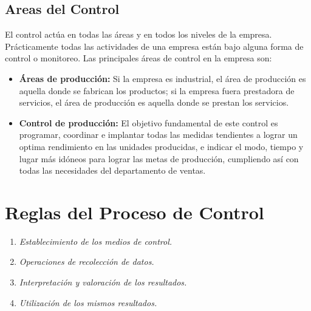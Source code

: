 \documentclass[12pt,letterpaper]{article}
\begin{document}
\subsection{Areas del Control}
El control actúa en todas las áreas y en todos los niveles de la empresa. Prácticamente todas las actividades de una empresa están bajo alguna forma de control o monitoreo. Las principales áreas de control en la empresa son:
\begin{itemize}
\item \textbf{Áreas de producción:} Si la empresa es industrial, el área de producción es aquella donde se fabrican los productos; si la empresa fuera prestadora de servicios, el área de producción es aquella donde se prestan los servicios.
\item \textbf{Control de producción:} El objetivo fundamental de este control es programar, coordinar e implantar todas las medidas tendientes a lograr un optima rendimiento en las unidades producidas, e indicar el modo, tiempo y lugar más idóneos para lograr las metas de producción, cumpliendo así con todas las necesidades del departamento de ventas. 
\end{itemize}
\section{Reglas del Proceso de Control}
\begin{enumerate}
\item	\textit{Establecimiento de los medios de control.}
\item	\textit{Operaciones de recolección de datos.}
\item	\textit{Interpretación y valoración de los resultados.}
\item	\textit{Utilización de los mismos resultados.}
\end{enumerate}
\end{document}
